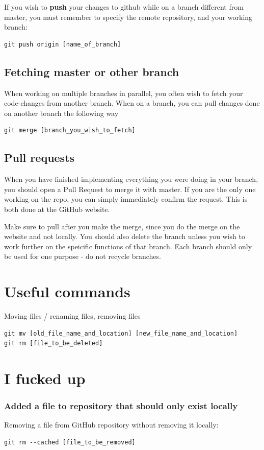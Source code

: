 \documentclass[12p,a4paper]{article}
\begin{document}
If you wish to \textbf{push} your changes to github while on a branch different from master, you must remember to specify the remote repository, and your working branch:
\begin{verbatim}
git push origin [name_of_branch]
\end{verbatim}


\subsection{Fetching master or other branch}
When working on multiple branches in parallel, you often wish to fetch your code-changes from another branch. When on a branch, you can pull changes done on another branch the following way
\begin{verbatim}
git merge [branch_you_wish_to_fetch]
\end{verbatim}

\subsection{Pull requests}
When you have finished implementing everything you were doing in your branch, you should open a Pull Request to merge it with master. If you are the only one working on the repo, you can simply immediately confirm the request. This is both done at the GitHub website.

Make sure to pull after you make the merge, since you do the merge on the website and not locally. You should also delete the branch unless you wish to work further on the speicific functions of that branch. Each branch should only be used for one purpose - do not recycle branches.


\newpage
\section{Useful commands}
Moving files / renaming files, removing files
\begin{verbatim}
git mv [old_file_name_and_location] [new_file_name_and_location]
git rm [file_to_be_deleted]
\end{verbatim}

\section{I fucked up}
\subsubsection{Added a file to repository that should only exist locally}
Removing a file from GitHub repository without removing it locally:
\begin{verbatim}
git rm --cached [file_to_be_removed]
\end{verbatim}
\end{document}
